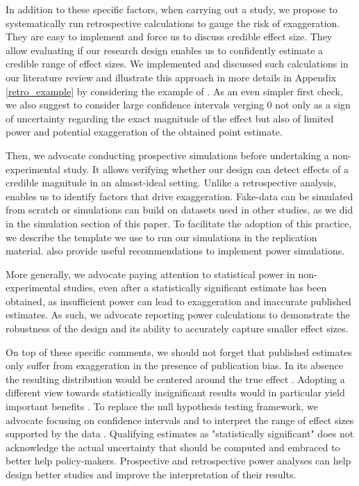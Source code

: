 \documentclass[12pt]{article}
\begin{document}
        In addition to these specific factors, when carrying out a study, we propose to systematically run retrospective calculations to gauge the risk of exaggeration. They are easy to implement and force us to discuss credible effect size. They allow evaluating if our research design enables us to confidently estimate a credible range of effect sizes. We implemented and discussed such calculations in our literature review and illustrate this approach in more details in Appendix \ref{retro_example} by considering the example of \cite{deryugina_mortality_2019}. As an even simpler first check, we also suggest to consider large confidence intervals verging 0 not only as a sign of uncertainty regarding the exact magnitude of the effect but also of limited power and potential exaggeration of the obtained point estimate.

        Then, we advocate conducting prospective simulations before undertaking a non-experimental study. It allows verifying whether our design can detect effects of a credible magnitude in an almost-ideal setting. Unlike a retrospective analysis, enables us to identify factors that drive exaggeration. Fake-data can be simulated from scratch or simulations can build on datasets used in other studies, as we did in the simulation section of this paper. To facilitate the adoption of this practice, we describe the template we use to run our simulations in the replication material. \cite{black_simulated_2022} also provide useful recommendations to implement power simulations.

        More generally, we advocate paying attention to statistical power in non-experimental studies, even after a statistically significant estimate has been obtained, as insufficient power can lead to exaggeration and inaccurate published estimates. As such, we advocate reporting power calculations to demonstrate the robustness of the design and its ability to accurately capture smaller effect sizes.

        On top of these specific comments, we should not forget that published estimates only suffer from exaggeration in the presence of publication bias. In its absence the resulting distribution would be centered around the true effect \citep{hernan_causal_2022}. Adopting a different view towards statistically insignificant results would in particular yield important benefits \citep{ziliak_cult_2008, wasserstein_asa_2016, mcshane_abandon_2019}. To replace the null hypothesis testing framework, we advocate focusing on confidence intervals and to interpret the range of effect sizes supported by the data \citep{amrhein_inferential_2019, romer2020praise}. 
        Qualifying estimates as "statistically significant" does not acknowledge the actual uncertainty that should be computed and embraced to better help policy-makers. Prospective and retrospective power analyses can help design better studies and improve the interpretation of their results.
        
\end{document}
